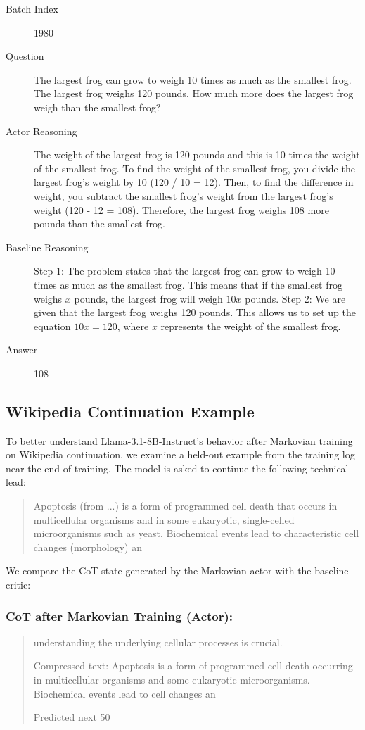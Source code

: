 \documentclass{article} %
\begin{document}
\begin{description}
    \item[Batch Index] 1980
    \item[Question] The largest frog can grow to weigh 10 times as much as the smallest frog. The largest frog weighs 120 pounds. How much more does the largest frog weigh than the smallest frog?
    \item[Actor Reasoning] The weight of the largest frog is 120 pounds and this is 10 times the weight of the smallest frog. To find the weight of the smallest frog, you divide the largest frog's weight by 10 (120 / 10 = 12). Then, to find the difference in weight, you subtract the smallest frog's weight from the largest frog's weight (120 - 12 = 108). Therefore, the largest frog weighs 108 more pounds than the smallest frog.
    \item[Baseline Reasoning] Step 1: The problem states that the largest frog can grow to weigh 10 times as much as the smallest frog. This means that if the smallest frog weighs $x$ pounds, the largest frog will weigh $10x$ pounds. Step 2: We are given that the largest frog weighs 120 pounds. This allows us to set up the equation $10x = 120$, where $x$ represents the weight of the smallest frog.
    \item[Answer] 108
\end{description}

\subsection{Wikipedia Continuation Example}
\label{app:case}

To better understand Llama-3.1-8B-Instruct's behavior after Markovian training on Wikipedia continuation, we examine a held-out example from the training log near the end of training. The model is asked to continue the following technical lead:

\begin{quote}
Apoptosis (from ...) is a form of programmed cell death that occurs in multicellular organisms and in some eukaryotic, single-celled microorganisms such as yeast. Biochemical events lead to characteristic cell changes (morphology) an
\end{quote}

We compare the CoT state generated by the Markovian actor with the baseline critic:

\subsubsection{CoT after Markovian Training (Actor):}
\begin{quote}
understanding the underlying cellular processes is crucial.

Compressed text: Apoptosis is a form of programmed cell death occurring in multicellular organisms and some eukaryotic microorganisms. Biochemical events lead to cell changes an

Predicted next 50
\end{quote}
\end{document}
